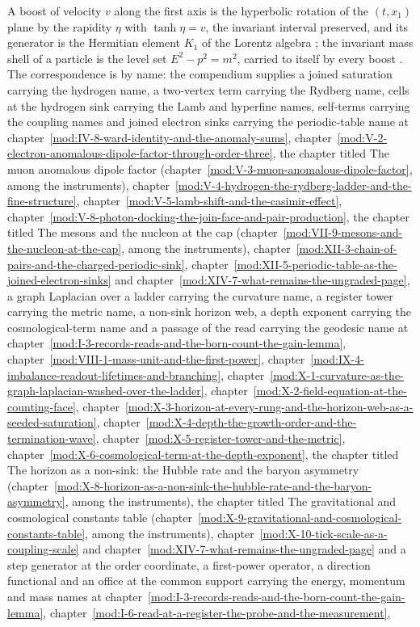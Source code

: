 \begin{chbridge}
A boost of velocity $v$ along the first axis is the hyperbolic rotation of the $(t, x_1)$ plane by the rapidity $\eta$ with $\tanh \eta = v$, the invariant interval preserved, and its generator is the Hermitian element $K_1$ of the Lorentz algebra \cite{Einstein1905,Weinberg1995}; the invariant mass shell of a particle is the level set $E^2 - p^2 = m^2$, carried to itself by every boost \cite{Weinberg1995}. The correspondence is by name: the compendium supplies a joined saturation carrying the hydrogen name, a two-vertex term carrying the Rydberg name, cells at the hydrogen sink carrying the Lamb and hyperfine names, self-terms carrying the coupling names and joined electron sinks carrying the periodic-table name at chapter~\ref{mod:IV-8-ward-identity-and-the-anomaly-sums}, chapter~\ref{mod:V-2-electron-anomalous-dipole-factor-through-order-three}, the chapter titled The muon anomalous dipole factor (chapter~\ref{mod:V-3-muon-anomalous-dipole-factor}, among the instruments), chapter~\ref{mod:V-4-hydrogen-the-rydberg-ladder-and-the-fine-structure}, chapter~\ref{mod:V-5-lamb-shift-and-the-casimir-effect}, chapter~\ref{mod:V-8-photon-docking-the-join-face-and-pair-production}, the chapter titled The mesons and the nucleon at the cap (chapter~\ref{mod:VII-9-mesons-and-the-nucleon-at-the-cap}, among the instruments), chapter~\ref{mod:XII-3-chain-of-pairs-and-the-charged-periodic-sink}, chapter~\ref{mod:XII-5-periodic-table-as-the-joined-electron-sinks} and chapter~\ref{mod:XIV-7-what-remains-the-ungraded-page}, a graph Laplacian over a ladder carrying the curvature name, a register tower carrying the metric name, a non-sink horizon web, a depth exponent carrying the cosmological-term name and a passage of the read carrying the geodesic name at chapter~\ref{mod:I-3-records-reads-and-the-born-count-the-gain-lemma}, chapter~\ref{mod:VIII-1-mass-unit-and-the-first-power}, chapter~\ref{mod:IX-4-imbalance-readout-lifetimes-and-branching}, chapter~\ref{mod:X-1-curvature-as-the-graph-laplacian-washed-over-the-ladder}, chapter~\ref{mod:X-2-field-equation-at-the-counting-face}, chapter~\ref{mod:X-3-horizon-at-every-rung-and-the-horizon-web-as-a-seeded-saturation}, chapter~\ref{mod:X-4-depth-the-growth-order-and-the-termination-wave}, chapter~\ref{mod:X-5-register-tower-and-the-metric}, chapter~\ref{mod:X-6-cosmological-term-at-the-depth-exponent}, the chapter titled The horizon as a non-sink: the Hubble rate and the baryon asymmetry (chapter~\ref{mod:X-8-horizon-as-a-non-sink-the-hubble-rate-and-the-baryon-asymmetry}, among the instruments), the chapter titled The gravitational and cosmological constants table (chapter~\ref{mod:X-9-gravitational-and-cosmological-constants-table}, among the instruments), chapter~\ref{mod:X-10-tick-scale-as-a-coupling-scale} and chapter~\ref{mod:XIV-7-what-remains-the-ungraded-page} and a step generator at the order coordinate, a first-power operator, a direction functional and an office at the common support carrying the energy, momentum and mass names at chapter~\ref{mod:I-3-records-reads-and-the-born-count-the-gain-lemma}, chapter~\ref{mod:I-6-read-at-a-register-the-probe-and-the-measurement}, 
\end{chbridge}
